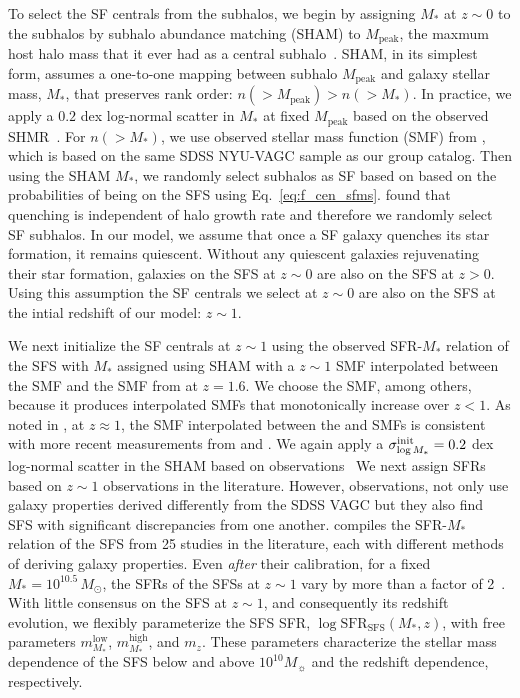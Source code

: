 \documentclass[12pt, letterpaper, preprint, tighten]{aastex62}
\newcommand{\siglogm}{\sigma_{\log M_*}}
\begin{document}
To select the SF centrals from the subhalos, we begin by assigning $M_*$
at $z\sim 0$ to the subhalos by subhalo abundance matching (SHAM) to $M_\mathrm{peak}$,
the maxmum host halo mass that it ever had as a central subhalo~\citep{conroy2006,vale2006,yang2009,wetzel2012,leja2013,wetzel2013,wetzel2014,hahn2017b}.
SHAM, in its simplest form, assumes a one-to-one mapping between subhalo
$M_\mathrm{peak}$ and galaxy stellar mass, $M_*$, that preserves rank
order: $n({>}M_\mathrm{peak}) > n({>}M_*)$. In practice, we apply a $0.2$
dex log-normal scatter in $M_*$ at fixed $M_\mathrm{peak}$ based on the
observed SHMR~\citep[\emph{e.g.}][]{mandelbaum2006a, more2011, velander2014, zu2015, gu2016, lange2018a}.
For $n({>}M_*)$, we use observed stellar mass function (SMF)
from \cite{li2009}, which is based on the same SDSS NYU-VAGC sample as our
group catalog. Then using the SHAM $M_*$, we randomly select subhalos as
SF based on based on the probabilities of being on the SFS using Eq.~\ref{eq:f_cen_sfms}.
\cite{tinker2017b,tinker2018} found that quenching is
independent of halo growth rate and therefore we randomly select SF subhalos.
In our model, we assume that once a SF galaxy quenches its star formation,
it remains quiescent.  %
Without any quiescent galaxies rejuvenating their star formation, galaxies
on the SFS at $z\sim0$ are also on the SFS at $z > 0$. Using this assumption
the SF centrals we select at $z \sim 0$ are also on the SFS at the intial
redshift of our model: $z \sim 1$.

We next initialize the SF centrals at $z\sim1$ using the observed SFR-$M_*$
relation of the SFS with $M_*$ assigned using SHAM with a $z\sim1$ SMF
interpolated between the \cite{li2009} SMF and the SMF from \cite{marchesini2009}
at $z = 1.6$. We choose the \cite{marchesini2009} SMF, among others, because it
produces interpolated SMFs that monotonically increase over $z < 1$. As noted
in \cite{hahn2017b}, at $z \approx 1$, the SMF interpolated between the
\cite{li2009} and \cite{marchesini2009} SMFs is consistent with more recent
measurements from \cite{muzzin2013} and \cite{ilbert2013}. We again apply a
$\siglogm^{\rm init} = 0.2$ dex log-normal scatter in the SHAM based on observations~\citep[\emph{e.g.}][]{leauthaud2012, tinker2013, patel2015}
We next assign SFRs based on $z \sim 1$ observations in the literature.
However, observations, not only use galaxy properties derived differently
from the SDSS VAGC but they also find SFS with significant discrepancies
from one another. \cite{speagle2014} compiles the SFR-$M_*$ relation of the
SFS from 25 studies in the literature, each with different methods of deriving
galaxy properties. Even \emph{after} their calibration, for a fixed
$M_* = 10^{10.5}\, M_\odot$, the SFRs of the SFSs at $z \sim 1$
vary by more than a factor of 2~\citep[see Figure 2 of][]{speagle2014}.
With little consensus on the SFS at $z\sim1$, and consequently its redshift
evolution, we flexibly parameterize the SFS SFR,
$\log\mathrm{SFR}_\mathrm{SFS}(M_*, z)$,
with free parameters $m^\mathrm{low}_{M_*}$, $m^\mathrm{high}_{M_*}$, and
$m_z$. These parameters characterize the stellar mass dependence of the SFS
below and above $10^{10} M_\sun$ and the redshift dependence, respectively.
\end{document}

